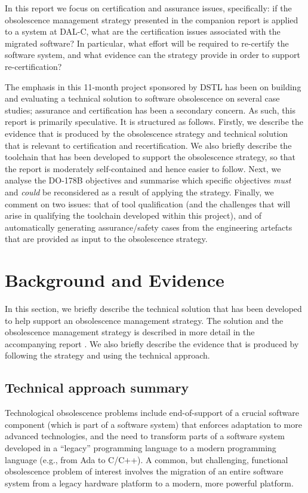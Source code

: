 \documentclass{llncs}
\begin{document}
In this report we focus on certification and assurance issues, specifically: if the obsolescence management strategy
presented in the companion report is applied to a system at DAL-C, what are the certification issues associated with
the migrated software? In particular, what effort will be required to re-certify the software system, and what evidence
can the strategy provide in order to support re-certification?

The emphasis in this 11-month project sponsored by DSTL has been on building and evaluating a technical solution to
software obsolescence on several case studies; assurance and certification has been a secondary concern. As such, this
report is primarily speculative. It is structured as follows. Firstly, we describe the evidence that is produced by the 
obsolescence strategy and technical solution that is relevant to certification and recertification. We also briefly describe
the toolchain that has been developed to support the obsolescence strategy, so that the report is moderately self-contained
and hence easier to follow. Next, we analyse the DO-178B objectives and summarise which specific objectives \textit{must} and
\textit{could} be reconsidered as a result of applying the strategy. Finally, we comment on two issues: that of tool qualification
(and the challenges that will arise in qualifying the toolchain developed within this project), and of automatically generating 
assurance/safety cases from the engineering artefacts that are provided as input to the obsolescence strategy.

\section{Background and Evidence}
In this section, we briefly describe the technical solution that has been developed to help support an obsolescence management
strategy. The solution and the obsolescence management strategy is described in more detail in the accompanying report \cite{Gerasimou2017}. 
We also briefly describe the evidence that is produced by following the strategy and using the technical approach.

\subsection{Technical approach summary}
Technological obsolescence problems
include end-of-support of a crucial software component (which is part of a 
software system) that enforces adaptation to more advanced technologies, and 
the 
need to transform parts of a software system developed in a ``legacy'' 
programming language to a modern programming language (e.g., from Ada to 
C/C++). 
A common, but challenging, functional obsolescence problem  of interest 
involves the migration of an entire software system from a legacy hardware 
platform to a modern, more powerful platform.
\end{document}
